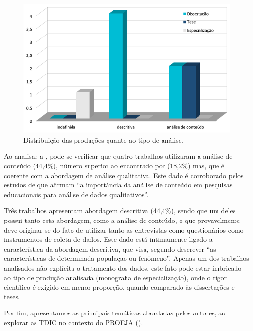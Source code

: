 \begin{figure}[!htpb]
\centering
\begin{minipage}{.5\textwidth}
\caption{Distribuição das produções quanto ao tipo de análise.}\label{fig6}
\includegraphics[width=\textwidth]{Fig6.png}
\end{minipage}
\end{figure}

Ao analisar a , pode-se verificar que quatro trabalhos
utilizaram a análise de conteúdo (44,4\%), número superior ao encontrado
por \textcite{minuzzi2020} (18,2\%) mas, que é coerente com a
abordagem de análise qualitativa. Este dado é corroborado pelos estudos
de \textcite[p.~14]{Palmeira2020} que afirmam ``a importância
da análise de conteúdo em pesquisas educacionais para análise de dados
qualitativos''.

Três trabalhos apresentam abordagem descritiva (44,4\%), sendo que um
deles possui tanto esta abordagem, como a análise de conteúdo, o que
provavelmente deve originar-se do fato de utilizar tanto as entrevistas
como questionários como instrumentos de coleta de dados. Este dado está
intimamente ligado a característica da abordagem descritiva, que visa,
segundo \textcite[p.~27]{Gil2010} descrever ``as características de determinada
população ou fenômeno''. Apenas um dos trabalhos analisados não
explícita o tratamento dos dados, este fato pode estar imbricado ao tipo
de produção analisada (monografia de especialização), onde o rigor
científico é exigido em menor proporção, quando comparado às
dissertações e teses.

Por fim, apresentamos as principais temáticas abordadas pelos autores,
ao explorar as TDIC no contexto do PROEJA ().

